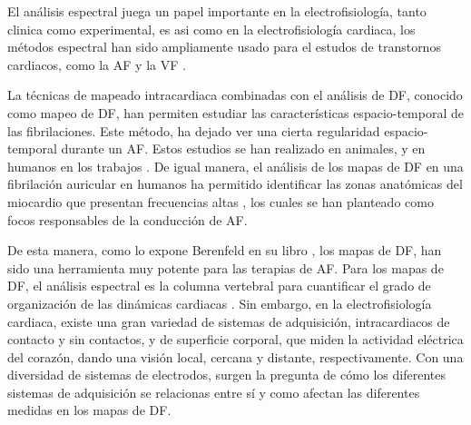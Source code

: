 El análisis espectral juega un papel importante en la electrofisiología, tanto
clinica como experimental, es asi como en la electrofisiología cardiaca, los
métodos espectral han sido ampliamente usado para el estudos de  transtornos
cardiacos, como la \ac{AF}  \cite{Everett01, Lazar04, Sanders05, Atienza06,
Atienza09, Uldry12, Guillem13, Kumagai13, Salinet14} y la  \ac{VF}
\cite{Strohmenger97, Eftestol00, Jekova04, Panfilov09, Mollerus11, Requena13}.



La técnicas de mapeado intracardiaca combinadas con  el análisis de \ac{DF},
conocido como mapeo de \ac{DF}, han permiten estudiar las
características espacio-temporal de las fibrilaciones. Este método, ha
dejado ver una cierta regularidad espacio-temporal durante un \ac{AF}.
Estos estudios se han realizado en animales,
\cite{Skanes98,Mandapati00,Mansour01} y en humanos  en los trabajos
\cite{Sanders05,Atienza06}. De igual manera, el análisis de los mapas de \ac{DF}
en una fibrilación auricular en humanos ha permitido identificar las zonas
anatómicas del miocardio que presentan frecuencias altas
\cite{ Sanders05, Atienza09, Kumagai13}, los cuales se han planteado como focos
responsables de la conducción de \ac{AF}.


De esta manera, como lo expone Berenfeld en su libro \cite{Berenfeld11Book},
los mapas de \ac{DF}, han sido una herramienta muy potente para las terapias de
\ac{AF}. Para los mapas de \ac{DF}, el análisis espectral es la columna
vertebral para cuantificar el grado de organización de las dinámicas cardiacas
\cite{Zipes09}. Sin embargo, en la electrofisiología cardiaca, existe una gran
variedad de sistemas de adquisición, intracardiacos de contacto y sin contactos,
y de superficie corporal, que miden la actividad eléctrica del corazón, dando
una visión local, cercana  y distante, respectivamente.
Con una  diversidad de sistemas de electrodos, surgen la pregunta de cómo los
diferentes sistemas de adquisición se relacionas entre sí y como afectan las
diferentes medidas en los mapas de \ac{DF}.


